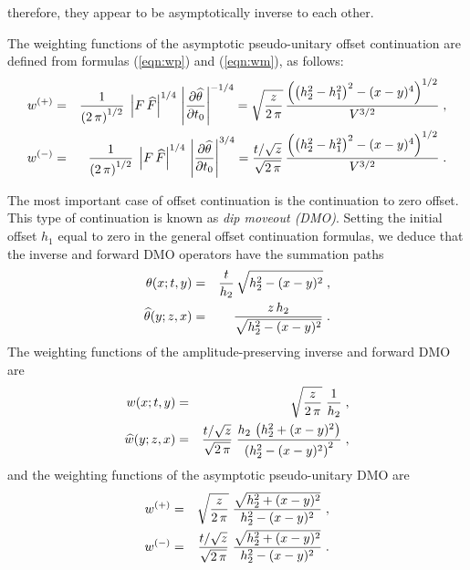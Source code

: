 therefore, they appear to be asymptotically inverse to each other. 
\par
The weighting functions of the asymptotic pseudo-unitary offset
continuation are defined from formulas (\ref{eqn:wp}) and (\ref{eqn:wm}), as follows:
\begin{eqnarray}
w^{(+)} & = & {1\over{\left(2\,\pi\right)^{1/2}}} \; 
\left|F\,\widehat{F}\right|^{1/4}\,
\left|\partial \widehat{\theta} \over \partial t_0\right|^{- 1/4} =
\sqrt{z \over {2\,\pi}}\,
{{\left(\left(h_2^2-h_1^2\right)^2 - (x-y)^4\right)^{1/2}} 
\over {V^{3/2}}}\;, 
\label{eqn:puwOC12} \\
w^{(-)} & = & {1\over{\left(2\,\pi\right)^{1/2}}} \; 
\left|F\,\widehat{F}\right|^{1/4}\,
\left|\partial \widehat{\theta} \over \partial t_0\right|^{3/4} =
{{t/\sqrt{z}} \over \sqrt{2\,\pi}}\,
{{\left(\left(h_2^2-h_1^2\right)^2 - (x-y)^4\right)^{1/2}} 
\over {V^{3/2}}}\;.
\label{eqn:puwOC21} 
\end{eqnarray}
\par
The most important case of offset continuation is the continuation
to zero offset. This type of continuation is known as {\em dip moveout
(DMO)}. Setting the initial offset $h_1$ equal to zero in the general
offset continuation formulas, we deduce that the inverse and forward
DMO operators have the summation paths
\begin{eqnarray}
\theta(x;t,y)  & = & {t \over h_2}\,\sqrt{h_2^2-(x-y)^2}\;,
\label{eqn:ttDMO12} \\
\widehat{\theta}(y;z,x) &  = & {{z \,h_2} \over \sqrt{h_2^2-(x-y)^2}}\;. 
\label{eqn:ttDMO21}
\end{eqnarray}
The weighting functions of the amplitude-preserving inverse and
forward DMO are
\begin{eqnarray}
w(x;t,y) & = & \sqrt{z \over {2\,\pi}}\;{1 \over h_2}\;,
\label{eqn:wDMO12} \\
\widehat{w}(y;z,x) & = & {{t/\sqrt{z}} \over \sqrt{2\,\pi}}\;
{{h_2\,\left(h_2^2 + (x-y)^2\right)} \over
{\left(h_2^2-(x-y)^2\right)^2}}\;,
\label{eqn:wDMO21} 
\end{eqnarray}
and the weighting functions of the asymptotic pseudo-unitary DMO are
\begin{eqnarray}
w^{(+)} & = & 
\sqrt{z \over {2\,\pi}}\;
{\sqrt{h_2^2 + (x-y)^2} \over {h_2^2-(x-y)^2}}\;,
\label{eqn:puDMO12} \\
w^{(-)} & = & 
{{t/\sqrt{z}} \over \sqrt{2\,\pi}}\;
{\sqrt{h_2^2 + (x-y)^2} \over {h_2^2-(x-y)^2}}\;.
\label{eqn:puDMO21} 
\end{eqnarray}
